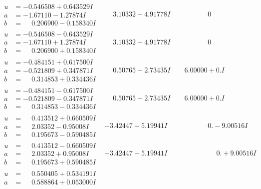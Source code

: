 \documentclass[1p]{elsarticle_modified}
\theoremstyle{definition}
\begin{document}
$$\begin{array}{c|c|c}
\begin{aligned}
u &= -0.546508 + 0.643529 I \\
a &= -1.67110 - 1.27874 I \\
b &= \phantom{-}0.206900 - 0.158340 I\end{aligned}
 & \phantom{-}3.10332 - 4.91778 I & \phantom{-0.000000 } 0 \\ \hline\begin{aligned}
u &= -0.546508 - 0.643529 I \\
a &= -1.67110 + 1.27874 I \\
b &= \phantom{-}0.206900 + 0.158340 I\end{aligned}
 & \phantom{-}3.10332 + 4.91778 I & \phantom{-0.000000 } 0 \\ \hline\begin{aligned}
u &= -0.484151 + 0.617500 I \\
a &= -0.521809 + 0.347871 I \\
b &= \phantom{-}0.314853 + 0.334436 I\end{aligned}
 & \phantom{-}0.50765 - 2.73435 I & \phantom{-}6.00000 + 0. I\phantom{ +0.000000I} \\ \hline\begin{aligned}
u &= -0.484151 - 0.617500 I \\
a &= -0.521809 - 0.347871 I \\
b &= \phantom{-}0.314853 - 0.334436 I\end{aligned}
 & \phantom{-}0.50765 + 2.73435 I & \phantom{-}6.00000 + 0. I\phantom{ +0.000000I} \\ \hline\begin{aligned}
u &= \phantom{-}0.413512 + 0.660509 I \\
a &= \phantom{-}2.03352 - 0.95008 I \\
b &= \phantom{-}0.195673 - 0.590485 I\end{aligned}
 & -3.42447 + 5.19941 I & \phantom{-0.000000 } 0. - 9.00516 I \\ \hline\begin{aligned}
u &= \phantom{-}0.413512 - 0.660509 I \\
a &= \phantom{-}2.03352 + 0.95008 I \\
b &= \phantom{-}0.195673 + 0.590485 I\end{aligned}
 & -3.42447 - 5.19941 I & \phantom{-0.000000 -}0. + 9.00516 I \\ \hline\begin{aligned}
u &= \phantom{-}0.550405 + 0.534191 I \\
a &= \phantom{-}0.588864 + 0.053000 I \\

\end{aligned}
\end{array}$$
\end{document}

